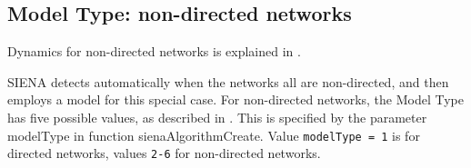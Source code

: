 \documentclass[a4paper,fleqn,11pt]{article}
\newcommand{\+}{\, + \,}
\newcommand{\sfn}[1]{\textsf{#1}}
\newcommand{\SI}{{\sf SIENA }}
\begin{document}

\subsection{Model Type: non-directed networks}
\label{S_modeltype_nd}

Dynamics for non-directed networks is explained in \citet{SnijdersPickup16}.

\SI detects automatically when the networks all are non-directed,
and then employs a model for this special case.
For non-directed networks, the Model Type has five possible values,
as described in \citet{SnijdersPickup16}.
This is specified by the parameter \sfn{modelType} in function
\sfn{sienaAlgorithmCreate}.
Value \texttt{modelType = 1} is for directed networks, values
\texttt{2-6} for non-directed networks.

\end{document}
